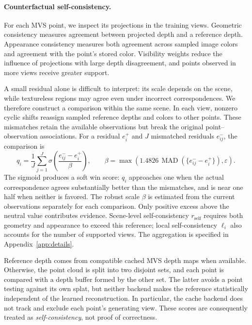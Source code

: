 \documentclass{article}
\newcommand{\rself}{r_{\mathrm{self}}}
\DeclareMathOperator{\MAD}{MAD}
\begin{document}
\paragraph{Counterfactual self-consistency.}
For each MVS point, we inspect its projections in the training views. Geometric consistency measures agreement between projected depth and a reference depth. Appearance consistency measures both agreement across sampled image colors and agreement with the point's stored color. Visibility weights reduce the influence of projections with large depth disagreement, and points observed in more views receive greater support.

A small residual alone is difficult to interpret: its scale depends on the scene, while textureless regions may agree even under incorrect correspondences. We therefore construct a comparison within the same scene. In each view, nonzero cyclic shifts reassign sampled reference depths and colors to other points. These mismatches retain the available observations but break the original point--observation associations. For a residual $e_i^+$ and $J$ mismatched residuals $e_{ij}^-$, the comparison is
\begin{equation}
q_i=\frac{1}{J}\sum_{j=1}^{J}
\sigma\!\left(\frac{e_{ij}^- - e_i^+}{\beta}\right),
\qquad
\beta=\max\!\left(1.4826\,\MAD(\{e_{ij}^- - e_i^+\}),\varepsilon\right).
\label{eq:calibration}
\end{equation}
The sigmoid produces a soft win score: $q_i$ approaches one when the actual correspondence agrees substantially better than the mismatches, and is near one half when neither is favored. The robust scale $\beta$ is estimated from the current observations separately for each comparison. Only positive excess above the neutral value contributes evidence. Scene-level self-consistency $\rself$ requires both geometry and appearance to exceed this reference; local self-consistency $\ell_i$ also accounts for the number of supported views. The aggregation is specified in Appendix~\ref{app:details}.

Reference depth comes from compatible cached MVS depth maps when available. Otherwise, the point cloud is split into two disjoint sets, and each point is compared with a depth buffer formed by the other set. The latter avoids a point testing against its own splat, but neither backend makes the reference statistically independent of the learned reconstruction. In particular, the cache backend does not track and exclude each point's generating view. These scores are consequently treated as \emph{self-consistency}, not proof of correctness.
\end{document}
